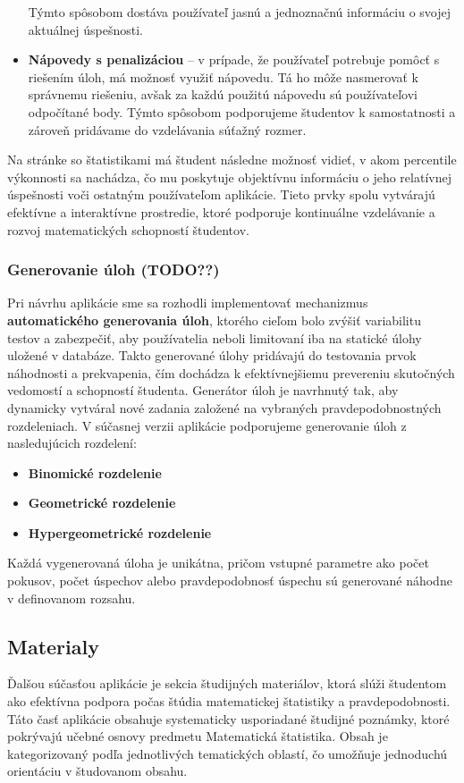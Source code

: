 \begin{itemize}
Týmto spôsobom dostáva používateľ jasnú a jednoznačnú informáciu o svojej aktuálnej úspešnosti.

\item \textbf{Nápovedy s penalizáciou} – v prípade, že používateľ potrebuje pomôcť s riešením úloh, má možnosť využiť nápovedu. Tá ho môže nasmerovať k správnemu riešeniu, avšak za každú použitú nápovedu sú používateľovi odpočítané body. Týmto spôsobom podporujeme študentov k samostatnosti a zároveň pridávame do vzdelávania súťažný rozmer. \end{itemize}

Na stránke so štatistikami má študent následne možnosť vidieť, v akom percentile výkonnosti sa nachádza, čo mu poskytuje objektívnu informáciu o jeho relatívnej úspešnosti voči ostatným používateľom aplikácie. Tieto prvky spolu vytvárajú efektívne a interaktívne prostredie, ktoré podporuje kontinuálne vzdelávanie a rozvoj matematických schopností študentov.
\subsubsection{Generovanie úloh (TODO??)}

Pri návrhu aplikácie sme sa rozhodli implementovať mechanizmus \textbf{automatického generovania úloh}, ktorého cieľom bolo zvýšiť variabilitu testov a zabezpečiť, aby používatelia neboli limitovaní iba na statické úlohy uložené v databáze. 
Takto generované úlohy pridávajú do testovania prvok náhodnosti a prekvapenia, čím dochádza k efektívnejšiemu prevereniu skutočných vedomostí a schopností študenta.
Generátor úloh je navrhnutý tak, aby dynamicky vytváral nové zadania založené na vybraných pravdepodobnostných rozdeleniach. V súčasnej verzii aplikácie podporujeme generovanie úloh z nasledujúcich rozdelení:

\begin{itemize} \item \textbf{Binomické rozdelenie} \item \textbf{Geometrické rozdelenie} \item \textbf{Hypergeometrické rozdelenie} \end{itemize}

Každá vygenerovaná úloha je unikátna, pričom vstupné parametre ako počet pokusov, počet úspechov alebo pravdepodobnosť úspechu sú generované náhodne v definovanom rozsahu.
\subsection{Materialy}
Ďalšou súčasťou aplikácie je sekcia študijných materiálov, ktorá slúži študentom ako efektívna podpora počas štúdia matematickej štatistiky a pravdepodobnosti. 
Táto časť aplikácie obsahuje systematicky usporiadané študijné poznámky, ktoré pokrývajú učebné osnovy predmetu Matematická štatistika.
 Obsah je kategorizovaný podľa jednotlivých tematických oblastí, čo umožňuje jednoduchú orientáciu v študovanom obsahu.


